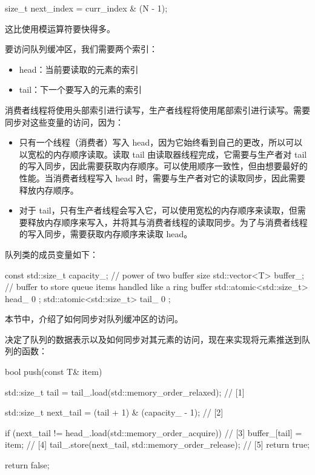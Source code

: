 \begin{cpp}
size_t next_index = curr_index & (N - 1);
\end{cpp}

这比使用模运算符要快得多。


要访问队列缓冲区，我们需要两个索引：

\begin{itemize}
\item
head：当前要读取的元素的索引

\item
tail：下一个要写入的元素的索引
\end{itemize}

消费者线程将使用头部索引进行读写，生产者线程将使用尾部索引进行读写。需要同步对这些变量的访问，因为：

\begin{itemize}
\item
只有一个线程（消费者）写入 head，因为它始终看到自己的更改，所以可以以宽松的内存顺序读取。读取 tail 由读取器线程完成，它需要与生产者对 tail 的写入同步，因此需要获取内存顺序。可以使用顺序一致性，但由想要最好的性能。当消费者线程写入 head 时，需要与生产者对它的读取同步，因此需要释放内存顺序。

\item
对于 tail，只有生产者线程会写入它，可以使用宽松的内存顺序来读取，但需要释放内存顺序来写入，并将其与消费者线程的读取同步。为了与消费者线程的写入同步，需要获取内存顺序来读取 head。
\end{itemize}

队列类的成员变量如下：

\begin{cpp}
const std::size_t capacity_; // power of two buffer size
std::vector<T> buffer_; // buffer to store queue items handled like a
ring buffer
std::atomic<std::size_t> head_{ 0 };
std::atomic<std::size_t> tail_{ 0 };
\end{cpp}

本节中，介绍了如何同步对队列缓冲区的访问。


决定了队列的数据表示以及如何同步对其元素的访问，现在来实现将元素推送到队列的函数：

\begin{cpp}
bool push(const T& item) {
    std::size_t tail =
        tail_.load(std::memory_order_relaxed); // [1]

    std::size_t next_tail =
        (tail + 1) & (capacity_ - 1); // [2]

    if (next_tail != head_.load(std::memory_order_acquire)) { // [3]
        buffer_[tail] = item; // [4]
        tail_.store(next_tail, std::memory_order_release); // [5]
        return true;
    }

    return false;
}
\end{cpp}

